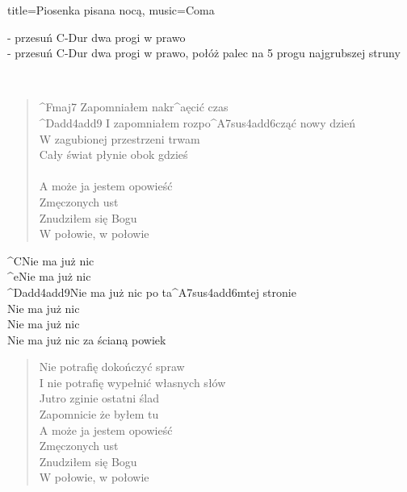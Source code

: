 \newpage
\small
\begin{song}{title={Piosenka pisana nocą}, music={Coma}} 
    \begin{info}
		 - przesuń C-Dur dwa progi w prawo \\
		 - przesuń C-Dur dwa progi w prawo, połóż palec na 5 progu najgrubszej struny  
    \end{info}
    \begin{intro}
          \\
    	 
    \end{intro}
    \begin{verse}
    	^{Fmaj7} Zapomniałem nakr^{a}ęcić czas \\
		^{Dadd4add9} I zapomniałem rozpo^{A7sus4add6}cząć nowy dzień \\
		W zagubionej przestrzeni trwam \\
		Cały świat płynie obok gdzieś \\ \\
		A może ja jestem opowieść \\
		Zmęczonych ust \\
		Znudziłem się Bogu \\
		W połowie, w połowie 
	\end{verse}
	\begin{chorus}
		^{C}Nie ma już nic \\
		^{e}Nie ma już nic \\
		^{Dadd4add9}Nie ma już nic po ta^{A7sus4add6}mtej stronie \\
		Nie ma już nic \\
		Nie ma już nic \\
		Nie ma już nic za  ścianą powiek \\
	\end{chorus}
	\begin{verse}
		Nie potrafię dokończyć spraw \\
		I nie potrafię wypełnić własnych słów \\
		Jutro zginie ostatni ślad \\
		Zapomnicie że byłem tu \\
		A może ja jestem opowieść \\
		Zmęczonych ust \\
		Znudziłem się Bogu \\
		W połowie, w połowie 
	\end{verse}
	\begin{chorus}

\end{chorus}
\end{song}
